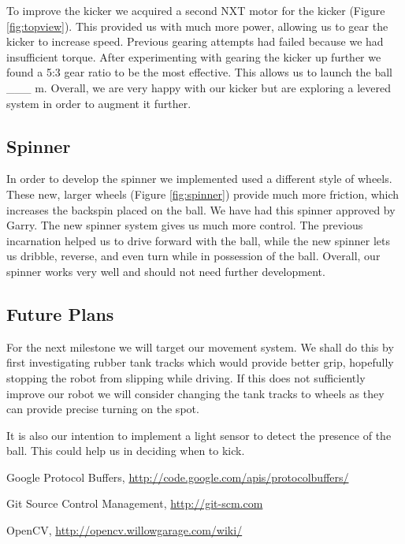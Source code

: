 \documentclass[12pt, a4paper, titlepage]{article}
\begin{document}
To improve the kicker we acquired a second NXT motor for the kicker (Figure
\ref{fig:topview}). This provided us with much more power, allowing us to gear
the kicker to increase speed. Previous gearing attempts had failed because we
had insufficient torque. After experimenting with gearing the kicker up further
we found a 5:3 gear ratio to be the most effective. This allows us to launch the
ball \_\_\_ m. Overall, we are very happy with our kicker but are exploring a
levered system in order to augment it further.

\subsection{Spinner}

In order to develop the spinner we implemented used a different style of wheels.
These new, larger wheels (Figure \ref{fig:spinner}) provide much more friction,
which increases the backspin placed on the ball. We have had this spinner
approved by Garry. The new spinner system gives us much more control. The
previous incarnation helped us to drive forward with the ball, while the new
spinner lets us dribble, reverse, and even turn while in possession of the ball.
Overall, our spinner works very well and should not need further development.

\subsection{Future Plans}

For the next milestone we will target our movement system. We shall do this
by first investigating rubber tank tracks which would provide better grip,
hopefully stopping the robot from slipping while driving. If this does not
sufficiently improve our robot we will consider changing the tank tracks to
wheels as they can provide precise turning on the spot.

It is also our intention to implement a light sensor to detect the presence of
the ball. This could help us in deciding when to kick.

\newpage

\setcounter{section}{5}
\begin{thebibliography}{9}

	Google Protocol Buffers,
	\url{http://code.google.com/apis/protocolbuffers/}

	Git Source Control Management,
	\url{http://git-scm.com}

	OpenCV,
	\url{http://opencv.willowgarage.com/wiki/}

\end{thebibliography}
\end{document}
